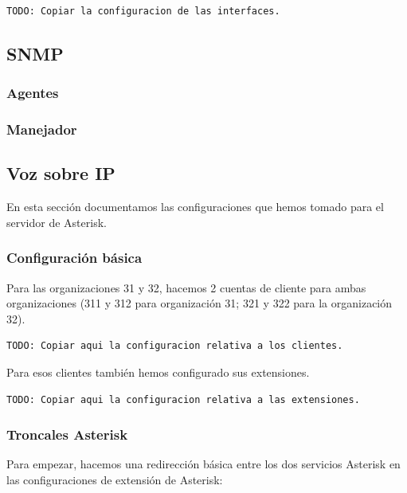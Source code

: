 \documentclass[]{article}
\begin{document}
\begin{lstlisting}
TODO: Copiar la configuracion de las interfaces.
\end{lstlisting}


\subsection{SNMP}

\subsubsection{Agentes}

\subsubsection{Manejador}

\subsection{Voz sobre IP}

En esta sección documentamos las configuraciones que hemos tomado para el servidor de Asterisk.

\subsubsection{Configuración básica}

Para las organizaciones 31 y 32, hacemos 2 cuentas de cliente para ambas organizaciones (311 y 312 para organización 31; 321 y 322 para la organización 32).

\begin{lstlisting}
TODO: Copiar aqui la configuracion relativa a los clientes.
\end{lstlisting}

Para esos clientes también hemos configurado sus extensiones.

\begin{lstlisting}
TODO: Copiar aqui la configuracion relativa a las extensiones.
\end{lstlisting}

\subsubsection{Troncales Asterisk}

Para empezar, hacemos una redirección básica entre los dos servicios Asterisk en las configuraciones de extensión de Asterisk:
\end{document}

